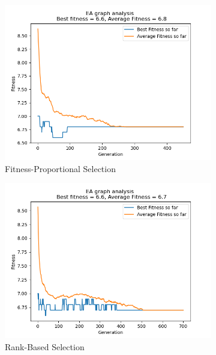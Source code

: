 \documentclass[conference,compsoc]{IEEEtran}
\begin{document}
\begin{figure}[h]
  \vspace{-1 em}
  \centering 
  \begin{subfigure}{0.34\textwidth}
    \includegraphics[width=\linewidth]{../Results/_11_FPS_Truncation_100_50_450.png}
    \caption{Fitness-Proportional Selection}
  \end{subfigure}
  \begin{subfigure}{0.34\textwidth}
    \includegraphics[width=\linewidth]{../Results/_11_RBS_Truncation_100_50_700.png}
    \caption{Rank-Based Selection}
  \end{subfigure}
  \begin{subfigure}{0.34\textwidth}

\end{subfigure}
\end{figure}
\end{document}
